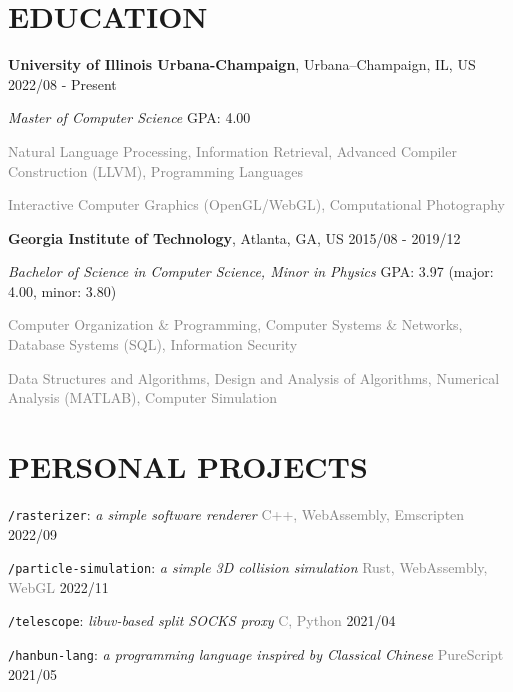 \documentclass[10pt]{article}
\begin{document}
\section*{EDUCATION}
\textbf{University of Illinois Urbana-Champaign}, Urbana–Champaign, IL, US  \hfill 2022/08 - Present

\textit{Master of Computer Science}  \hfill GPA: 4.00

\vspace{0.5em}
\textcolor{gray}{Natural Language Processing, Information Retrieval, Advanced Compiler Construction (LLVM), Programming Languages}

\textcolor{gray}{Interactive Computer Graphics (OpenGL/WebGL), Computational Photography}

\vspace{1em}
\textbf{Georgia Institute of Technology}, Atlanta, GA, US \hfill 2015/08 - 2019/12

\textit{Bachelor of Science in Computer Science, Minor in Physics} \hfill GPA: 3.97 (major: 4.00, minor: 3.80)

\vspace{0.5em}
\textcolor{gray}{Computer Organization \& Programming, Computer Systems \& Networks, Database Systems (SQL), Information Security}

\textcolor{gray}{Data Structures and Algorithms, Design and Analysis of Algorithms, Numerical Analysis (MATLAB), Computer Simulation}


\section*{PERSONAL PROJECTS}

\vspace{0.5em}
\texttt{/rasterizer}: \textit{a simple software renderer} \hfill \textcolor{gray}{C++, WebAssembly, Emscripten} 2022/09

\vspace{0.5em}
\texttt{/particle-simulation}: \textit{a simple 3D collision simulation} \hfill \textcolor{gray}{Rust, WebAssembly, WebGL}  2022/11

\vspace{0.5em}
\texttt{/telescope}: \textit{libuv-based split SOCKS proxy} \hfill \textcolor{gray}{C, Python}  2021/04

\vspace{0.5em}
\texttt{/hanbun-lang}: \textit{a programming language inspired by Classical Chinese} \hfill \textcolor{gray}{PureScript}  2021/05
\end{document}
